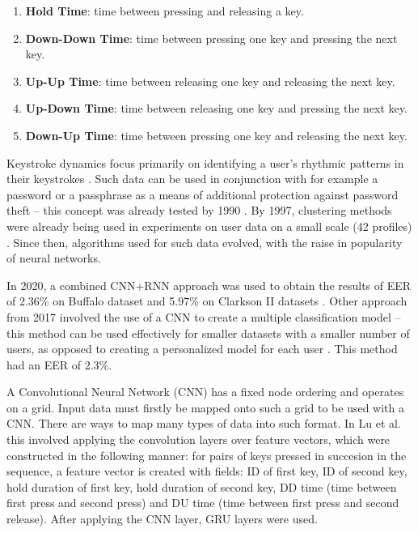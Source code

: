 \begin{enumerate}
    \item \textbf{Hold Time}: time between pressing and releasing a key.
    \item \textbf{Down-Down Time}: time between pressing one key and pressing the next key.
    \item \textbf{Up-Up Time}: time between releasing one key and releasing the next key.
    \item \textbf{Up-Down Time}: time between releasing one key and pressing the next key.
    \item \textbf{Down-Up Time}: time between pressing one key and releasing the next key.
\end{enumerate}

Keystroke dynamics focus primarily on identifying a user's rhythmic patterns in their keystrokes \cite{Lu2020}. Such data can be used in conjunction with for example a password or a passphrase as a means of additional protection against password theft -- this concept was already tested by 1990 \cite{joyce1990keystroke}. By 1997, clustering methods were already being used in experiments on user data on a small scale (42 profiles) \cite{Monr1997}. Since then, algorithms used for such data evolved, with the raise in popularity of neural networks.

In 2020, a combined CNN+RNN approach was used to obtain the results of EER of 2.36\% on Buffalo dataset and 5.97\% on Clarkson II datasets \cite{Lu2020}. Other approach from 2017 involved the use of a CNN to create a multiple classification model -- this method can be used effectively for smaller datasets with a smaller number of users, as opposed to creating a personalized model for each user \cite{ceker_cnn2017}\cite{Lu2020}. This method had an EER of 2.3\%. 

A Convolutional Neural Network (CNN) has a fixed node ordering and operates on a grid. Input data must firstly be mapped onto such a grid to be used with a CNN. There are ways to map many types of data into such format. In Lu et al. this involved applying the convolution layers over feature vectors, which were constructed in the following manner: for pairs of keys pressed in succesion in the sequence, a feature vector is created with fields: ID of first key, ID of second key, hold duration of first key, hold duration of second key, DD time (time between first press and second press) and DU time (time between first press and second release). After applying the CNN layer, GRU layers were used.

